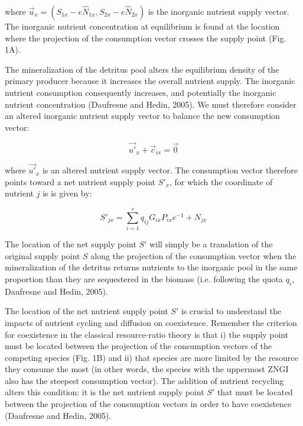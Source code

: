 \documentclass[letterpaper,twocolumn,showkeys]{revtex4-1}
\begin{document}
where $\overrightarrow{u}_{x}=(S_{1x}-e\widehat{N}_{1x},S_{2x}-e\widehat{N}_{2x})$ is the inorganic nutrient supply vector. The inorganic nutrient concentration at equilibrium is found at the location where the projection of the consumption vector crosses the supply point (Fig. 1A). 

	The mineralization of the detritus pool alters the equilibrium density of the primary producer because it increases the overall nutrient supply. The inorganic nutrient consumption consequently increases, and potentially the inorganic nutrient concentration (Daufresne and Hedin, 2005). We must therefore consider an altered inorganic nutrient supply vector to balance the new consumption vector:

\begin{equation}
	\label{e:bnet}
	\overrightarrow{u'}_{x}+\overrightarrow{c}_{ix}=\overrightarrow{0}
\end{equation}

where $\overrightarrow{u'}_{x}$ is an altered nutrient supply vector. The consumption vector therefore points toward a net nutrient supply point $S'_{x}$, for which the coordinate of nutrient $j$ is is given by:

\begin{equation}
	\label{e:bnet}
	S'_{jx}=\sum_{i=1}^{s}q_{ij}G_{ix}P_{ix}e^{-1}+N_{jx}
\end{equation}

The location of the net supply point $S'$ will simply be a translation of the original supply point $S$ along the projection of the consumption vector when the mineralization of the detritus returns nutrients to the inorganic pool in the same proportion than they are sequestered in the biomass (i.e. following the quota $q_{i}$, Daufresne and Hedin, 2005). 

	The location of the net nutrient supply point $S'$ is crucial to understand the impacts of nutrient cycling and diffusion on coexistence. Remember the criterion for coexistence in the classical resource-ratio theory is that i) the supply point must be located between the projection of the consumption vectors of the competing species (Fig. 1B) and ii) that species are more limited by the resource they consume the most (in other words, the species with the uppermost ZNGI also has the steepest consumption vector). The addition of nutrient recycling alters this condition: it is the net nutrient supply point $S'$ that must be located between the projection of the consumption vectors in order to have coexistence (Daufresne and Hedin, 2005). 
\end{document}
